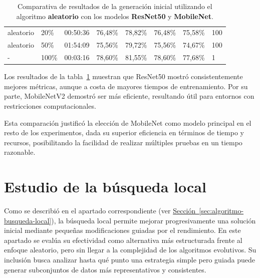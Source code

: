 \begin{table}[htp]
{\begin{tabular}{lp{2cm}lp{2cm}p{2cm}p{2cm}p{2cm}p{2.2cm}}
            aleatorio                & 20\%                        & 00:50:36                & 76,48\%                 & 78,82\% & 76,48\% & 75,58\% & 100 \\
            aleatorio                & 50\%                        & 01:54:09                & 75,56\%                 & 79,72\% & 75,56\% & 74,67\% & 100 \\
            -                        & 100\%                       & 00:03:16                & 78,60\%                 & 81,55\% & 78,60\% & 77,68\% & 1   \\
            \bottomrule
        \end{tabular}
    }
    \caption{Comparativa de resultados de la generación inicial utilizando el algoritmo \textbf{aleatorio} con los modelos \textbf{ResNet50} y \textbf{MobileNet}.}
    \label{tab:resnet50-vs-mobilenet}
\end{table}

Los resultados de la tabla~\ref{tab:resnet50-vs-mobilenet} muestran que ResNet50 mostró consistentemente mejores métricas,
aunque a costa de mayores tiempos de entrenamiento.
Por su parte, MobileNetV2 demostró ser más eficiente, resultando útil para entornos con restricciones computacionales.

Esta comparación justificó la elección de MobileNet como modelo principal en el resto de los experimentos,
dada su superior eficiencia en términos de tiempo y recursos, posibilitando la facilidad de realizar múltiples pruebas en un tiempo razonable.


\section{Estudio de la búsqueda local}\label{sec:estudio-busqueda-local}
Como se describió en el apartado correspondiente (ver \hyperref[sec:algoritmo-busqueda-local]{Sección~\ref*{sec:algoritmo-busqueda-local}}),
la búsqueda local permite mejorar progresivamente una solución inicial mediante pequeñas modificaciones guiadas por el rendimiento.
En este apartado se evalúa su efectividad como alternativa más estructurada frente al enfoque aleatorio, pero sin llegar a la complejidad de los algoritmos evolutivos.
Su inclusión busca analizar hasta qué punto una estrategia simple pero guiada puede generar subconjuntos de datos más representativos y consistentes.

